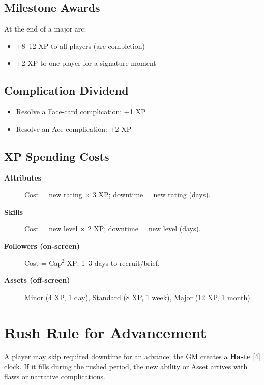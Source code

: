 \subsection{Milestone Awards}
\label{subsec:milestone-awards}
At the end of a major arc:
\begin{itemize}
\item +8–12 XP to all players (arc completion)
\item +2 XP to one player for a signature moment
\end{itemize}

\subsection{Complication Dividend}
\label{subsec:complication-dividend}
\begin{itemize}
\item Resolve a Face-card complication: +1 XP
\item Resolve an Ace complication: +2 XP
\end{itemize}

\subsection{XP Spending Costs}
\label{subsec:xp-spending}
\begin{description}
\item[\textbf{Attributes}] Cost = new rating $\times$ 3 XP; downtime = new rating (days). 
\item[\textbf{Skills}] Cost = new level $\times$ 2 XP; downtime = new level (days). 
\item[\textbf{Followers (on-screen)}] Cost = Cap$^{2}$ XP; 1–3 days to recruit/brief. 
\item[\textbf{Assets (off-screen)}] Minor (4 XP, 1 day), Standard (8 XP, 1 week), Major (12 XP, 1 month). 
\end{description}

\section{Rush Rule for Advancement}
\label{sec:rush-rule}
A player may skip required downtime for an advance; the GM creates a \textbf{Haste} [4] clock. If it fills during the rushed period, the new ability or Asset arrives with flaws or narrative complications.

